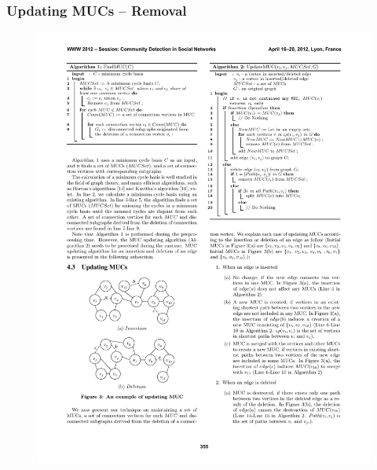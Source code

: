 \begin{frame}
  \frametitle{Updating MUCs -- Removal}
  
  \begin{figure}[t]
    \centering
    \includegraphics[width=\textwidth, height=0.6\textheight, keepaspectratio]{imgs/qube-removal}
  \end{figure}
\end{frame}
  

